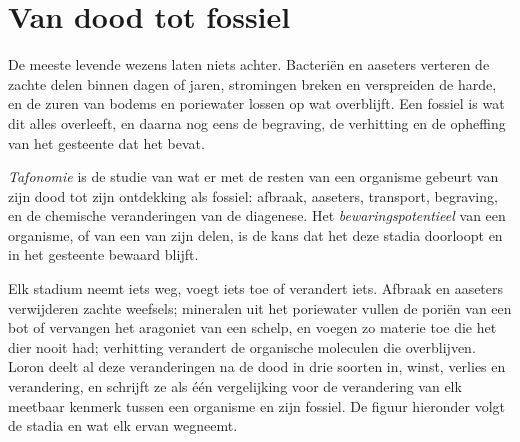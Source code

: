 \section{Van dood tot fossiel}\label{sec:b2:palaeoenvironments:taphonomy}

De meeste levende wezens laten niets achter. Bacteriën en aaseters verteren de zachte delen binnen
dagen of jaren, stromingen breken en verspreiden de harde, en de zuren van bodems en poriewater
lossen op wat overblijft. Een fossiel is wat dit alles overleeft, en daarna nog eens de begraving,
de verhitting en de opheffing van het gesteente dat het bevat.

\begin{definition}\label{def:b2:palaeoenvironments:taphonomy}
\emph{Tafonomie} is de studie van wat er met de resten van een organisme gebeurt
van zijn dood tot zijn ontdekking als fossiel: afbraak, aaseters, transport, begraving, en de
chemische veranderingen van de diagenese. Het \emph{bewaringspotentieel}
van een organisme, of van een van zijn delen, is de kans dat het deze stadia doorloopt
en in het gesteente bewaard blijft.
\end{definition}

Elk stadium neemt iets weg, voegt iets toe of verandert iets. Afbraak en aaseters verwijderen
zachte weefsels; mineralen uit het poriewater vullen de poriën van een bot of vervangen het aragoniet van een
schelp, en voegen zo materie toe die het dier nooit had; verhitting verandert de organische moleculen die overblijven.
Loron deelt al deze veranderingen na de dood in drie soorten in, winst, verlies en verandering, en
schrijft ze als één vergelijking voor de verandering van elk meetbaar kenmerk tussen een organisme en zijn
fossiel. De figuur hieronder volgt de stadia en wat elk ervan wegneemt.

